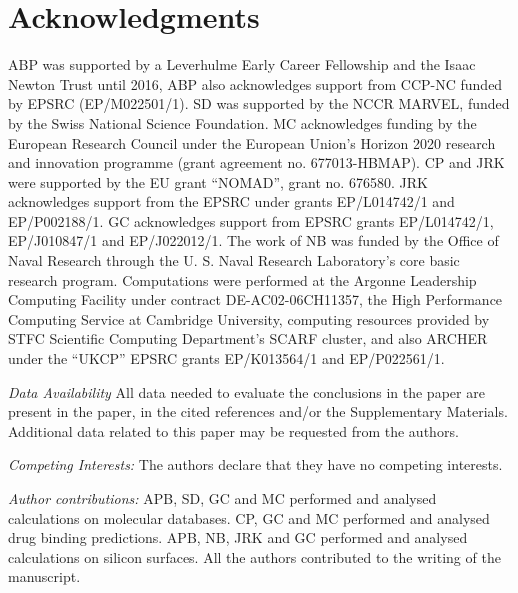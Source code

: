 \documentclass[12pt]{article}
\begin{document}
\section{Acknowledgments}
ABP was supported by a Leverhulme Early Career Fellowship and the Isaac Newton Trust until 2016, ABP also acknowledges support from CCP-NC funded by EPSRC (EP/M022501/1).
SD was supported by the NCCR MARVEL, funded by the Swiss National Science Foundation. MC acknowledges funding
by the European Research Council under the European Union’s Horizon 2020 research and innovation programme (grant agreement no. 677013-HBMAP).
CP and JRK were supported by the EU grant ``NOMAD'', grant no. 676580.
JRK acknowledges support from the EPSRC under grants EP/L014742/1 and EP/P002188/1. GC acknowledges support from EPSRC grants EP/L014742/1, EP/J010847/1 and EP/J022012/1. The work of NB was funded by the Office of Naval Research through the U. S. Naval Research Laboratory’s core basic research program.
 Computations were performed at the Argonne Leadership Computing Facility  under contract DE-AC02-06CH11357, the High Performance Computing Service at Cambridge University, computing resources provided by STFC Scientific Computing Department's SCARF cluster, and also ARCHER under the ``UKCP'' EPSRC grants EP/K013564/1 and EP/P022561/1.

\emph{Data Availability}
All data needed to evaluate the conclusions in the paper are present in the paper, in the cited references and/or the Supplementary Materials. Additional data related to this paper may be requested from the authors.

\emph{Competing Interests:} The authors declare that they have no competing interests.

\emph{Author contributions:} APB, SD, GC and MC performed and analysed calculations on molecular databases. CP, GC and MC performed and analysed drug binding predictions. APB, NB, JRK and GC performed and analysed calculations on silicon surfaces. All the authors contributed to the writing of the manuscript. 


%
\nocite{bart+10prl,WGAP,aCgap,Perdew:1992jd,CASTEP,VanDuin:2001ud,Buehler:2006cm,Lenosky:2000wy,Tersoff:1988to,STILLINGER:1985vxa,solares2005,Sadowski:1994uj,OBoyle:2011cw,Wang:2004fe,Stewart:2012fa,MOPAC2016:online,Gaussian09:program,Ramakrishnan:2014ij,Becke:1993is,STEPHENS:1994jt,Curtiss:1998jm,MOLPRO_brief,fabe+17jctc,huo2017unified,Krishnan:1980kt,ceri+13jctc,bart+13prb,mont+13njp,de+16pccp,de+16pccp,ropo+16sd,mari+16jctc,soapxx}
\end{document}

